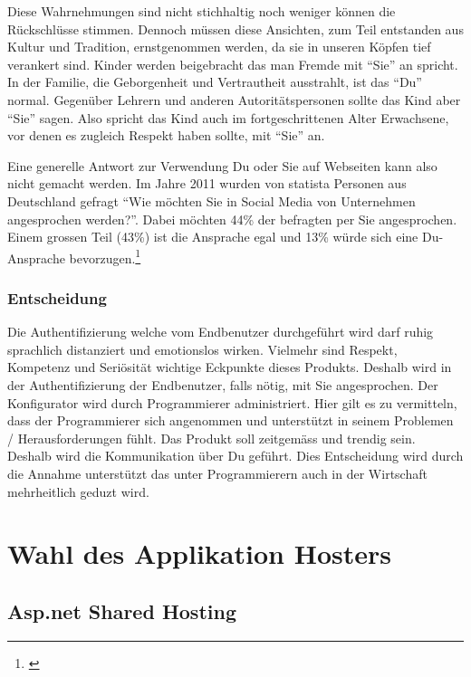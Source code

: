 Diese Wahrnehmungen sind nicht stichhaltig noch weniger können die
Rückschlüsse stimmen. Dennoch müssen diese Ansichten, zum Teil
entstanden aus Kultur und Tradition, ernstgenommen werden, da sie in
unseren Köpfen tief verankert sind. Kinder werden beigebracht das man
Fremde mit ``Sie'' an spricht. In der Familie, die Geborgenheit und
Vertrautheit ausstrahlt, ist das ``Du'' normal. Gegenüber Lehrern und
anderen Autoritätspersonen sollte das Kind aber ``Sie'' sagen. Also
spricht das Kind auch im fortgeschrittenen Alter Erwachsene, vor denen
es zugleich Respekt haben sollte, mit ``Sie'' an.

Eine generelle Antwort zur Verwendung Du oder Sie auf Webseiten kann
also nicht gemacht werden. Im Jahre 2011 wurden von statista Personen
aus Deutschland gefragt ``Wie möchten Sie in Social Media von
Unternehmen angesprochen werden?''. Dabei möchten 44\% der befragten per
Sie angesprochen. Einem grossen Teil (43\%) ist die Ansprache egal und
13\% würde sich eine Du-Ansprache bevorzugen.\footnote{\autocite{statistadusie}}

\newpage

\subsubsection{Entscheidung}\label{entscheidung-2}

Die Authentifizierung welche vom Endbenutzer durchgeführt wird darf
ruhig sprachlich distanziert und emotionslos wirken. Vielmehr sind
Respekt, Kompetenz und Seriösität wichtige Eckpunkte dieses Produkts.
Deshalb wird in der Authentifizierung der Endbenutzer, falls nötig, mit
Sie angesprochen. Der Konfigurator wird durch Programmierer
administriert. Hier gilt es zu vermitteln, dass der Programmierer sich
angenommen und unterstützt in seinem Problemen / Herausforderungen
fühlt. Das Produkt soll zeitgemäss und trendig sein. Deshalb wird die
Kommunikation über Du geführt. Dies Entscheidung wird durch die Annahme
unterstützt das unter Programmierern auch in der Wirtschaft mehrheitlich
geduzt wird.

\newpage

\section{Wahl des Applikation
Hosters}\label{wahl-des-applikation-hosters}

\subsection{Asp.net Shared Hosting}\label{asp.net-shared-hosting}

